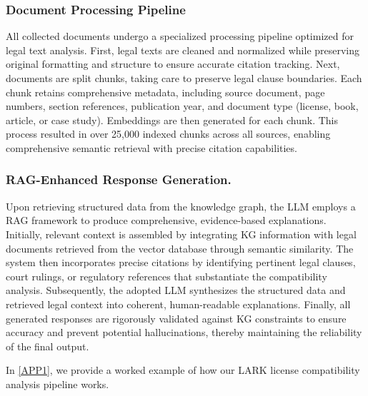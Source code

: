 \subsubsection{Document Processing Pipeline}

All collected documents undergo a specialized processing pipeline optimized for legal text analysis. First, legal texts are cleaned and normalized while preserving original formatting and structure to ensure accurate citation tracking. Next, documents are split chunks, taking care to preserve legal clause boundaries. Each chunk retains comprehensive metadata, including source document, page numbers, section references, publication year, and document type (license, book, article, or case study). Embeddings are then generated for each chunk.
This process resulted in over 25,000 indexed chunks across all sources, enabling comprehensive semantic retrieval with precise citation capabilities.

\subsubsection{RAG-Enhanced Response Generation.}

Upon retrieving structured data from the knowledge graph, the LLM employs a RAG framework to produce comprehensive, evidence-based explanations. Initially, relevant context is assembled by integrating KG information with legal documents retrieved from the vector database through semantic similarity. The system then incorporates precise citations by identifying pertinent legal clauses, court rulings, or regulatory references that substantiate the compatibility analysis. Subsequently, the adopted LLM synthesizes the structured data and retrieved legal context into coherent, human-readable explanations. Finally, all generated responses are rigorously validated against KG constraints to ensure accuracy and prevent potential hallucinations, thereby maintaining the reliability of the final output.

In \ref{APP1}, we provide a worked example of how our LARK license compatibility analysis pipeline works.




